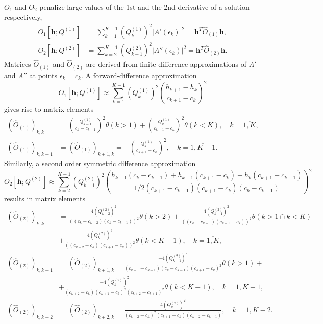 \documentclass[]{article}
\begin{document}
$O_1$ and $O_2$ penalize large values of the 1st and the 2nd derivative of a solution respectively,
\begin{align}
    O_1[\mathbf{h};Q^{(1)}] &= \sum_{k=1}^{K-1}
        (Q^{(1)}_k)^2 |A'(\epsilon_k)|^2 =
        \mathbf{h}^T \hat O_{(1)} \mathbf{h},\\
    O_2[\mathbf{h};Q^{(2)}] &= \sum_{k=2}^{K-1}
        (Q^{(2)}_{k-1})^2 |A''(\epsilon_k)|^2 =
        \mathbf{h}^T \hat O_{(2)} \mathbf{h}.
\end{align}
Matrices $\hat O_{(1)}$ and $\hat O_{(2)}$ are derived from finite-difference approximations of $A'$ and $A''$ at points $\epsilon_k = c_k$. A forward-difference approximation
\begin{equation}\label{cc_update:finite_diff_forward}
    O_1[\mathbf{h};Q^{(1)}] \approx \sum_{k=1}^{K-1} (Q^{(1)}_k)^2
        \left(\frac{h_{k+1} - h_k}{c_{k+1} - c_k}\right)^2
\end{equation}
gives rise to matrix elements
\begin{align}
    (\hat O_{(1)})_{k,k} &=
    \left(\frac{Q^{(1)}_{k-1}}{c_k - c_{k-1}}\right)^2 \theta(k>1) +
    \left(\frac{Q^{(1)}_k}{c_{k+1} - c_{k}}\right)^2\theta(k<K),
    \quad k=\overline{1,K},\\
    (\hat O_{(1)})_{k,k+1} &= (\hat O_{(1)})_{k+1,k} =
    -\left(\frac{Q^{(1)}_k}{c_{k+1} - c_k}\right)^2, \quad k=\overline{1,K-1}.
\end{align}
Similarly, a second order symmetric difference approximation
\begin{equation}\label{cc_update:finite_diff_2_symm}
    O_2[\mathbf{h};Q^{(2)}] \approx \sum_{k=2}^{K-1} (Q^{(2)}_{k-1})^2
    \left(\frac
    {h_{k+1}(c_k - c_{k - 1}) + h_{k-1} (c_{k+1} - c_k) - h_k(c_{k+1} - c_{k-1})}
    {1/2(c_{k+1} - c_{k-1})(c_{k+1} - c_{k})(c_{k} - c_{k-1})}
    \right)^2
\end{equation}
results in matrix elements
\begin{align}
    (\hat O_{(2)})_{k,k} &=
    \frac{4 (Q^{(2)}_{k-2})^2}{((c_k - c_{k-2})(c_k - c_{k-1}))^2}\theta(k>2) +
    \frac{4 (Q^{(2)}_{k-1})^2}{((c_k - c_{k-1})(c_{k+1} - c_{k}))^2}\theta(k>1 \cap k<K) \nonumber +\\&+
    \frac{4 (Q^{(2)}_k)^2}{((c_{k+2} - c_k)(c_{k+1} - c_k))^2}\theta(k<K-1),
    \quad k=\overline{1,K},\\
    (\hat O_{(2)})_{k,k+1} &= (\hat O_{(2)})_{k+1,k} =
    \frac{-4(Q^{(2)}_{k-1})^2}{(c_{k+1} - c_{k-1})(c_k - c_{k-1})(c_{k+1} - c_k)^2}\theta(k>1) \nonumber +\\&+
    \frac{-4(Q^{(2)}_k)^2}{(c_{k+2} - c_k)(c_{k+1} - c_k)^2(c_{k+2} - c_{k+1})^2}\theta(k<K-1),
    \quad k=\overline{1,K-1},\\
    (\hat O_{(2)})_{k,k+2} &= (\hat O_{(2)})_{k+2,k} =
    \frac{4(Q^{(2)}_{k})^2}{(c_{k+2} - c_{k})^2(c_{k+1} - c_k)(c_{k+2} - c_{k+1})}, \quad k=\overline{1,K-2}.
\end{align}
\end{document}
